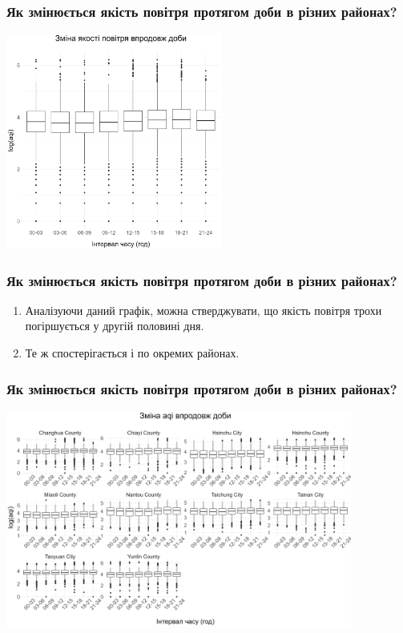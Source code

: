 \documentclass{beamer}
\begin{document}

\begin{frame}
  \frametitle{Як змінюється якість повітря протягом доби в різних районах?}

  \begin{center}
    \includegraphics[height=2.8in]{plots/question3/box.png}
  \end{center}
\end{frame}

\begin{frame}
  \frametitle{Як змінюється якість повітря протягом доби в різних районах?}

  \begin{enumerate}
    \item Аналізуючи даний графік, можна стверджувати, що якість повітря трохи
    погіршується у другій половині дня.
    \item Те ж спостерігається і по окремих районах.
  \end{enumerate}
\end{frame}

\begin{frame}
  \frametitle{Як змінюється якість повітря протягом доби в різних районах?}

  \begin{center}
    \includegraphics[height=2.8in]{plots/question3/county-box-p1.png}
  \end{center}
\end{frame}
\end{document}
